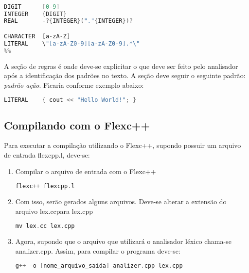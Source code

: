 \begin{apendicesenv}
\begin{lstlisting}[language=c, label=apendiceCodigoFlex3, caption=Seção de definições]

DIGIT      [0-9]
INTEGER    {DIGIT}
REAL       -?{INTEGER}("."{INTEGER})?

CHARACTER  [a-zA-Z]
LITERAL    \"[a-zA-Z0-9][a-zA-Z0-9].*\"
%%
\end{lstlisting}


A seção de regras é onde deve-se explicitar o que deve ser feito pelo analisador após a identificação dos padrões no texto. A seção deve seguir o seguinte padrão: \textit{padrão    ação}. Ficaria conforme exemplo abaixo:

\begin{lstlisting}[language=c, label=apendiceCodigoFlex4, caption=Seção de regras]
%%
LITERAL    { cout << "Hello World!"; }
\end{lstlisting}

\subsection{Compilando com o Flexc++}

Para executar a compilação utilizando o Flexc++, supondo possuir um arquivo de entrada flexcpp.l, deve-se:
\begin{enumerate}
\item Compilar o arquivo de entrada com o Flexc++


\begin{lstlisting}[language=c, label=apendiceCodigoFlex5, caption=Comando para compilar flexc++]
 flexc++ flexcpp.l
\end{lstlisting}

\item Com isso, serão gerados alguns arquivos. Deve-se alterar a extensão do arquivo lex.ccpara lex.cpp

\begin{lstlisting}[language=c, label=apendiceCodigoFlex6, caption=Comando para alterar extensão dos arquivos]
mv lex.cc lex.cpp
\end{lstlisting}

\item Agora, supondo que o arquivo que utilizará o analisador léxico chama-se analizer.cpp. Assim, para compilar o programa deve-se:

\begin{lstlisting}[language=c, label=apendiceCodigoFlex7, caption=Compilar o programa]
g++ -o [nome_arquivo_saida] analizer.cpp lex.cpp
\end{lstlisting}
\end{enumerate}


\end{apendicesenv}
